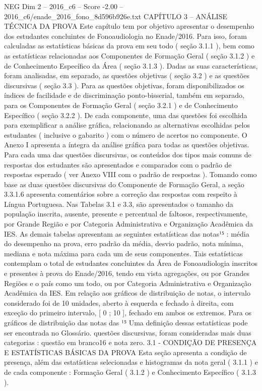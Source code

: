 \begin{textsample}{NEG Dim 2 – 2016\_c6 – Score -2.00 – 2016\_c6/enade\_2016\_fono\_8d596b926e.txt}  \label{ex:f2_neg_221}
CAPÍTULO 3 – ANÁLISE TÉCNICA DA PROVA Este capítulo tem por objetivo apresentar o desempenho dos estudantes concluintes de Fonoaudiologia no Enade/2016.
Para isso, foram calculadas as estatísticas básicas da prova em seu todo ( seção 3.1.1 ), bem como as estatísticas relacionadas aos Componentes de Formação Geral ( seção 3.1.2 ) e de Conhecimento Específico da Área ( seção 3.1.3 ).
Dadas as suas características, foram analisadas, em separado, as questões objetivas ( seção 3.2 ) e as questões discursivas ( seção 3.3 ).
Para as questões objetivas, foram disponibilizados os índices de facilidade e de discriminação ponto-bisserial, também em separado, para os Componentes de Formação Geral ( seção 3.2.1 ) e de Conhecimento Específico ( seção 3.2.2 ).
De cada componente, uma das questões foi escolhida para exemplificar a análise gráfica, relacionando as alternativas escolhidas pelos estudantes ( inclusive o gabarito ) com o número de acertos no componente.
O Anexo I apresenta a íntegra da análise gráfica para todas as questões objetivas.
Para cada uma das questões discursivas, os conteúdos dos tipos mais comuns de respostas dos estudantes são apresentados e comparados com o padrão de respostas esperado ( ver Anexo VIII com o padrão de respostas ).
Tomando como base as duas questões discursivas do Componente de Formação Geral, a seção 3.3.1.6 apresenta comentários sobre a correção das respostas com respeito à Língua Portuguesa.
Nas Tabelas 3.1 e 3.3, são apresentados o tamanho da população inscrita, ausente, presente e percentual de faltosos, respectivamente, por Grande Região e por Categoria Administrativa e Organização Acadêmica da IES.
As demais tabelas apresentam as seguintes estatísticas das notas¹⁵ : média do desempenho na prova, erro padrão da média, desvio padrão, nota mínima, mediana e nota máxima para cada um de seus componentes.
Tais estatísticas contemplam o total de estudantes concluintes da Área de Fonoaudiologia inscritos e presentes à prova do Enade/2016, tendo em vista agregações, ou por Grandes Regiões e o país como um todo, ou por Categoria Administrativa e Organização Acadêmica da IES.
Em relação aos gráficos de distribuição de notas, o intervalo considerado foi de 10 unidades, aberto à esquerda e fechado à direita, com exceção do primeiro intervalo, [ 0 ; 10 ], fechado em ambos os extremos.
Para os gráficos de distribuição das notas das ¹⁵ Uma definição dessas estatísticas pode ser encontrada no Glossário. questões discursivas, foram consideradas mais duas categorias : questão em branco16 e nota zero. 3.1 - CONDIÇÃO DE PRESENÇA E ESTATÍSTICAS BÁSICAS DA PROVA Esta seção apresenta a condição de presença, além das estatísticas selecionadas e histogramas da nota geral ( 3.1.1 ) e de cada componente : Formação Geral ( 3.1.2 ) e Conhecimento Específico ( 3.1.3 ).

\end{textsample}
